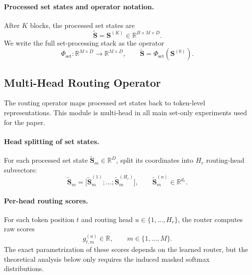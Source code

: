 \documentclass{article}
\theoremstyle{plain}
\theoremstyle{definition}
\theoremstyle{remark}
\begin{document}
\paragraph{Processed set states and operator notation.}
After $K$ blocks, the processed set states are
\begin{equation}
\label{eq:final-set-states}
\widetilde{\mathbf S}=\mathbf S^{(K)}\in\mathbb R^{B\times M\times D}.
\end{equation}
We write the full set-processing stack as the operator
\begin{equation}
\label{eq:set-stack-operator}
\Phi_{\mathrm{set}}:\mathbb R^{M\times D}\to\mathbb R^{M\times D},
\qquad
\widetilde{\mathbf S}=\Phi_{\mathrm{set}}(\mathbf S^{(0)}).
\end{equation}

\subsection{Multi-Head Routing Operator}
\label{sec:routing-operator}

The routing operator maps processed set states back to token-level representations. This module is multi-head in all main set-only experiments used for the paper.

\paragraph{Head splitting of set states.}
For each processed set state $\widetilde{\mathbf S}_m\in\mathbb R^D$, split its coordinates into $H_r$ routing-head subvectors:
\begin{equation}
\label{eq:head-split}
\widetilde{\mathbf S}_m=\bigl[\widetilde{\mathbf S}_m^{(1)};\dots;\widetilde{\mathbf S}_m^{(H_r)}\bigr],
\qquad
\widetilde{\mathbf S}_m^{(u)}\in\mathbb R^{d_r}.
\end{equation}

\paragraph{Per-head routing scores.}
For each token position $t$ and routing head $u\in\{1,\dots,H_r\}$, the router computes raw scores
\begin{equation}
\label{eq:routing-scores}
g^{(u)}_{t,m}\in\mathbb R,
\qquad m\in\{1,\dots,M\}.
\end{equation}
The exact parametrization of these scores depends on the learned router, but the theoretical analysis below only requires the induced masked softmax distributions.
\end{document}
